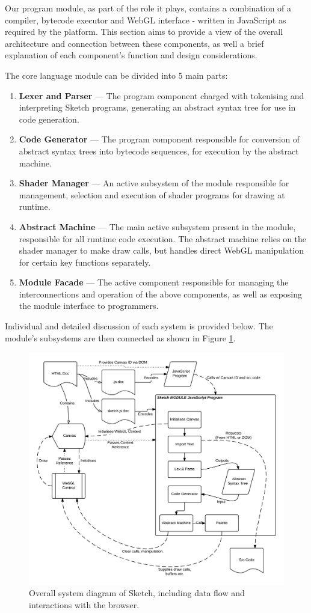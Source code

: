 \documentclass{l3proj}
\begin{document}
Our program module, as part of the role it plays, contains a combination of a compiler, bytecode executor and WebGL interface - written in JavaScript as required by the platform. This section aims to provide a view of the overall architecture and connection between these components, as well a brief explanation of each component's function and design considerations.

The core language module can be divided into 5 main parts:
\begin{enumerate}
\item \textbf{Lexer and Parser} --- The program component charged with tokenising and interpreting Sketch programs, generating an abstract syntax tree for use in code generation.
\item \textbf{Code Generator} --- The program component responsible for conversion of abstract syntax trees into bytecode sequences, for execution by the abstract machine.
\item \textbf{Shader Manager} --- An active subsystem of the module responsible for management, selection and execution of shader programs for drawing at runtime.
\item \textbf{Abstract Machine} --- The main active subsystem present in the module, responsible for all runtime code execution. The abstract machine relies on the shader manager to make draw calls, but handles direct WebGL manipulation for certain key functions separately.
\item \textbf{Module Facade} --- The active component responsible for managing the interconnections and operation of the above components, as well as exposing the module interface to programmers.
\end{enumerate}
Individual and detailed discussion of each system is provided below. The module's subsystems are then connected as shown in Figure \ref{fig:sketch-overall}.
\begin{figure}[!h]
\centering
\includegraphics[width=\textwidth]{images/sys-diag}
\caption{Overall system diagram of Sketch, including data flow and interactions with the browser.}
\label{fig:sketch-overall}
\end{figure}
\end{document}
